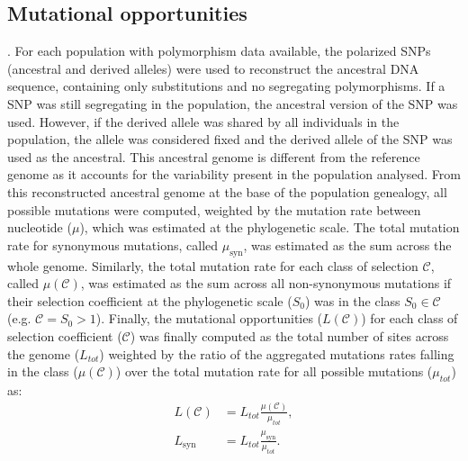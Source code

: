 \documentclass{article}
\newcommand{\Sphy}{S_{0}}
\newcommand{\Sphyclass}{\mathcal{C}}
\newcommand{\divAdv}{ \Sphy > 1}
\begin{document}
    \subsection{Mutational opportunities}
    \label{subsec:nunber-of-sites}.
    For each population with polymorphism data available, the polarized SNPs (ancestral and derived alleles) were used to reconstruct the ancestral DNA sequence, containing only substitutions and no segregating polymorphisms.
    If a SNP was still segregating in the population, the ancestral version of the SNP was used.
    However, if the derived allele was shared by all individuals in the population, the allele was considered fixed and the derived allele of the SNP was used as the ancestral.
    This ancestral genome is different from the reference genome as it accounts for the variability present in the population analysed.
    From this reconstructed ancestral genome at the base of the population genealogy, all possible mutations were computed, weighted by the mutation rate between nucleotide ($\mu$), which was estimated at the phylogenetic scale.
    The total mutation rate for synonymous mutations, called $\mu_{\textrm{syn}}$, was estimated as the sum across the whole genome.
    Similarly, the total mutation rate for each class of selection $\Sphyclass$, called $\mu\left( \Sphyclass \right)$, was estimated as the sum across all non-synonymous mutations if their selection coefficient at the phylogenetic scale ($\Sphy$) was in the class $\Sphy \in \Sphyclass$ (e.g. $\Sphyclass = \divAdv$).
    Finally, the mutational opportunities ($L \left( \Sphyclass \right)$) for each class of selection coefficient ($\Sphyclass$) was finally computed as the total number of sites across the genome ($L_{tot}$) weighted by the ratio of the aggregated mutations rates falling in the class ($\mu\left( \Sphyclass \right)$) over the total mutation rate for all possible mutations ($\mu_{tot}$) as:
    \begin{align}
        L \left( \Sphyclass \right) &= L_{tot} \frac{\mu\left( \Sphyclass \right)}{\mu_{tot}}, \\
        L_{\textrm{syn}} &= L_{tot} \frac{\mu_{\textrm{syn}}}{\mu_{tot}}.
    \end{align}
\end{document}
